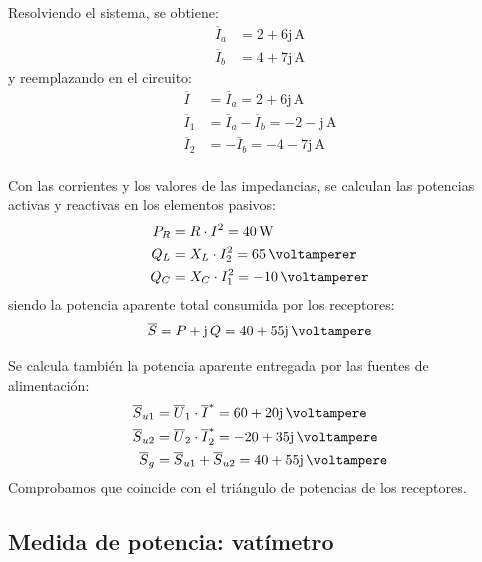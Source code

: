 \begin{example}
  \vspace{3mm} Resolviendo el sistema, se obtiene:
  \begin{align*}
    \overline{I}_a&= 2 + 6\mathrm{j}\,\unit{\ampere}\\
    \overline{I}_b&= 4 + 7\mathrm{j}\,\unit{\ampere}
  \end{align*}          
  y reemplazando en el circuito:
  \begin{align*}
    \overline{I}&=\overline{I}_a= 2 + 6\mathrm{j}\,\unit{\ampere}\\
    \overline{I}_1&=\overline{I}_a - \overline{I}_b= -2 -\mathrm{j}\,\unit{\ampere}\\
    \overline{I}_2&=-\overline{I}_b= -4 - 7\mathrm{j}\,\unit{\ampere}\\
  \end{align*}	

  \vspace{-3mm} Con las corrientes y los valores de las impedancias,
  se calculan las potencias activas y reactivas en los elementos
  pasivos:
  \begin{align*}
    P_R&=R\cdot I^2=\qty{40}{\watt}\\
    Q_L &= X_L\cdot I_2^2=\qty{65}{\voltamperer}\\
    Q_C&=X_C\cdot I_1^2=-\qty{10}{\voltamperer}
  \end{align*}
  siendo la potencia aparente total consumida por los receptores:
  \begin{equation*}
    \overline{S}=P+\mathrm{j}\,Q= 40 + 55\mathrm{j}\,\unit{\voltampere}
  \end{equation*}
		
  Se calcula también la potencia aparente entregada por las fuentes de
  alimentación:
  \begin{align*}
    \overline{S}_{u1}&=\overline{U}_1\cdot \overline{I}^*= 60 + 20\mathrm{j}\,\unit{\voltampere}\\
    \overline{S}_{u2}&=\overline{U}_2\cdot \overline{I}_2^*= -20 + 35\mathrm{j}\,\unit{\voltampere}\\
    \overline{S}_g &= \overline{S}_{u1} + \overline{S}_{u2} = 40 + 55\mathrm{j}\,\unit{\voltampere}
  \end{align*}
  Comprobamos que coincide con el triángulo de potencias de los
  receptores.
                        
\end{example}
	
\subsection{Medida de potencia: vatímetro}\label{sec.medida_potencia}
	
